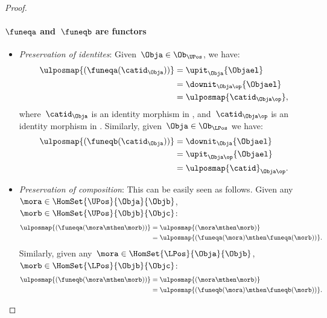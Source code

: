 \begin{proof}
    \paragraph*{$\funeqa$ and~$\funeqb$ are functors}
    \begin{itemize}
        \item \emph{Preservation of identites}: Given~$\Obja\in \Ob_{\UPos}$, we have:
        \begin{equation*}
            \begin{aligned}
                \ulposmap{(\funeqa(\catid_\Obja))}&=\upit_\Obja\{\Objael\}\\
                &=\downit_{\Obja\op}\{\Objael\}\\
                &=\ulposmap{\catid_{\Obja\op}},
            \end{aligned}
        \end{equation*}
        where~$\catid_\Obja$ is an identity morphism in \UPos, and~$\catid_{\Obja\op}$ is an identity morphism in \LPos.
        Similarly, given~$\Obja\in \Ob_{\LPos}$ we have:
        \begin{equation*}
            \begin{aligned}
                \ulposmap{(\funeqb(\catid_\Obja))}&=\downit_\Obja\{\Objael\}\\
                &=\upit_{\Obja\op}\{\Objael\}\\
                &=\ulposmap{\catid}_{\Obja\op}.
            \end{aligned}
        \end{equation*}
        \item \emph{Preservation of composition}: This can be easily seen as follows.
        Given any~$\mora\in \HomSet{\UPos}{\Obja}{\Objb}$,~$\morb\in \HomSet{\UPos}{\Objb}{\Objc}$:
        \begin{equation*}
            \begin{aligned}
                \ulposmap{(\funeqa(\mora \mthen \morb))}&=\ulposmap{(\mora\mthen \morb)}\\
                &=\ulposmap{(\funeqa(\mora)\mthen \funeqa(\morb))}.
            \end{aligned}
        \end{equation*}
        Similarly, given any~$\mora\in \HomSet{\LPos}{\Obja}{\Objb}$,~$\morb\in \HomSet{\LPos}{\Objb}{\Objc}$:
        \begin{equation*}
            \begin{aligned}
                \ulposmap{(\funeqb(\mora \mthen \morb))}&=\ulposmap{(\mora \mthen \morb)}\\
                &=\ulposmap{(\funeqb(\mora)\mthen \funeqb(\morb))}.
            \end{aligned}
        \end{equation*}
    \end{itemize}

\end{proof}
